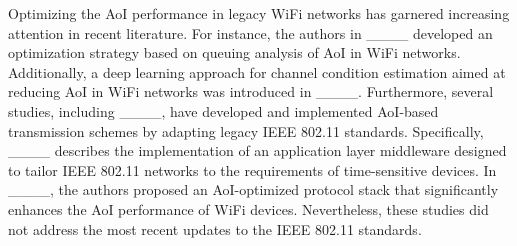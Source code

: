 Optimizing the AoI performance in legacy WiFi networks has garnered increasing attention in recent literature. For instance, the authors in ____ developed an optimization strategy based on queuing analysis of AoI in WiFi networks. Additionally, a deep learning approach for channel condition estimation aimed at reducing AoI in WiFi networks was introduced in ____. Furthermore, several studies, including ____, have developed and implemented AoI-based transmission schemes by adapting legacy IEEE 802.11 standards. Specifically, ____ describes the implementation of an application layer middleware designed to tailor IEEE 802.11 networks to the requirements of time-sensitive devices. In ____, the authors proposed an AoI-optimized protocol stack that significantly enhances the AoI performance of WiFi devices. Nevertheless, these studies did not address the most recent updates to the IEEE 802.11 standards.
